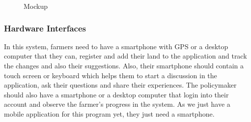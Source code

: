 \begin{figure}[H]
  \centering
  
  \hfill
  \hfill
  \hfill

  \caption{Mockup}
\end{figure}

    \subsubsection{Hardware Interfaces}
    In this system, farmers need to have a smartphone with GPS or a desktop computer that they can, register and add their land to the application and track the changes and also their suggestions. Also, their smartphone should contain a touch screen or keyboard which helps them to start a discussion in the application, ask their questions and share their experiences. The policymaker should also have a smartphone or a desktop computer that login into their account and observe the farmer’s progress in the system. As we just have a mobile application for this program yet, they just need a smartphone.
